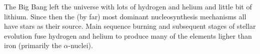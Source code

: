 The Big Bang left the universe with lots of hydrogen and helium and little bit of lithium.  Since then the (by far) most dominant  nucleosynthesis mechanisms all have stars as their source.  Main sequence burning and subsequent stages of stellar evolution fuse hydrogen and helium to produce many of the elements ligher than iron (primarily the $\alpha$-nuclei).  